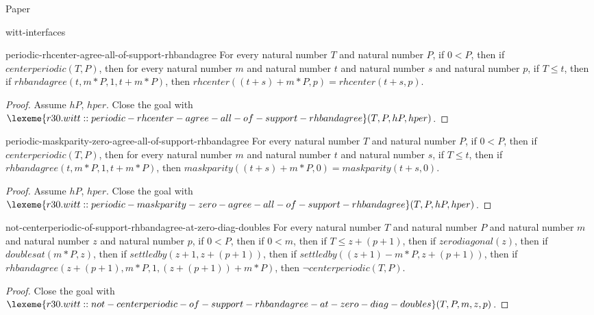 \begin{lexlean}{Paper}
\begin{section}{witt-interfaces}
  \begin{theorem}{periodic-rhcenter-agree-all-of-support-rhbandagree}
  For every natural number \(T\) and natural number \(P\), if \(0 < P\), then if \(centerperiodic(T, P)\), then for every natural number \(m\) and natural number \(t\) and natural number \(s\) and natural number \(p\), if \(T ≤ t\), then if \(rhbandagree(t, m * P, 1, t + m * P)\), then \(rhcenter((t + s) + m * P, p) = rhcenter(t + s, p)\).
  \begin{proof}
  Assume \(hP\), \(hper\).
  Close the goal with \(\lexeme{r30.witt::periodic-rhcenter-agree-all-of-support-rhbandagree}(T, P, hP, hper)\).
  \end{proof}
  \end{theorem}

  \begin{theorem}{periodic-maskparity-zero-agree-all-of-support-rhbandagree}
  For every natural number \(T\) and natural number \(P\), if \(0 < P\), then if \(centerperiodic(T, P)\), then for every natural number \(m\) and natural number \(t\) and natural number \(s\), if \(T ≤ t\), then if \(rhbandagree(t, m * P, 1, t + m * P)\), then \(maskparity((t + s) + m * P, 0) = maskparity(t + s, 0)\).
  \begin{proof}
  Assume \(hP\), \(hper\).
  Close the goal with \(\lexeme{r30.witt::periodic-maskparity-zero-agree-all-of-support-rhbandagree}(T, P, hP, hper)\).
  \end{proof}
  \end{theorem}

  \begin{theorem}{not-centerperiodic-of-support-rhbandagree-at-zero-diag-doubles}
  For every natural number \(T\) and natural number \(P\) and natural number \(m\) and natural number \(z\) and natural number \(p\), if \(0 < P\), then if \(0 < m\), then if \(T ≤ z + (p + 1)\), then if \(zerodiagonal(z)\), then if \(doublesat(m * P, z)\), then if \(settledby(z + 1, z + (p + 1))\), then if \(settledby((z + 1) - m * P, z + (p + 1))\), then if \(rhbandagree(z + (p + 1), m * P, 1, (z + (p + 1)) + m * P)\), then \(¬ centerperiodic(T, P)\).
  \begin{proof}
  Close the goal with \(\lexeme{r30.witt::not-centerperiodic-of-support-rhbandagree-at-zero-diag-doubles}(T, P, m, z, p)\).
  \end{proof}
  \end{theorem}


\end{section}
\end{lexlean}

